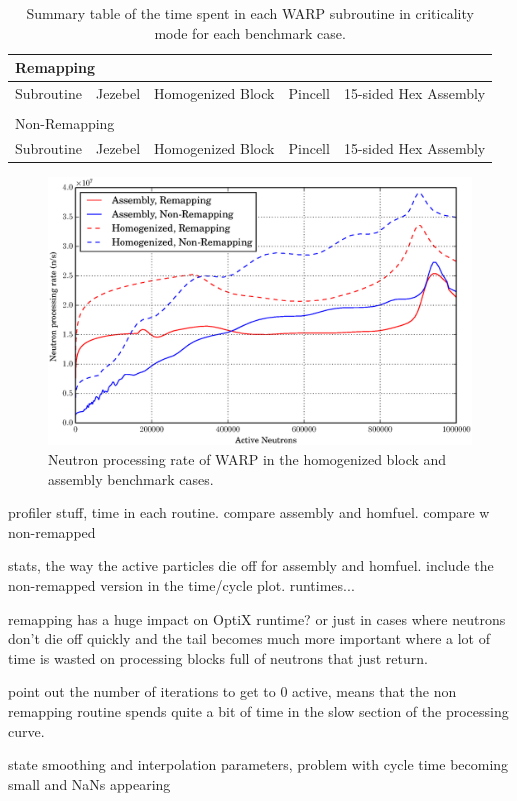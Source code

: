 \begin{table}[h]
\centering
\caption{Summary table of the time spent in each WARP subroutine in criticality mode for each benchmark case.}
\label{profile_summary}
\begin{tabular}{| l | r  | r | r | r |}
\multicolumn{5}{l}{Remapping} \\
 \hline
 Subroutine & Jezebel & Homogenized Block & Pincell & 15-sided Hex Assembly  \\
\hline
\hline
\multicolumn{5}{l}{} \\
\multicolumn{5}{l}{Non-Remapping} \\
 \hline
 Subroutine & Jezebel & Homogenized Block & Pincell & 15-sided Hex Assembly  \\
\hline
\hline
\end{tabular}
\end{table}

\begin{figure}[h!]
\centering
\includegraphics[width=\textwidth]{graphics/finalresults/process_rate.eps}
\caption{Neutron processing rate of WARP in the homogenized block and assembly benchmark cases. \label{process_rate} }
\end{figure}

profiler stuff, time in each routine.  compare assembly and homfuel.  compare w non-remapped

stats, the way the active particles die off for assembly and homfuel.  include the non-remapped version in the time/cycle plot.  runtimes...

remapping has a huge impact on OptiX runtime?  or just in cases where neutrons don't die off quickly and the tail becomes much more important where a lot of time is wasted on processing blocks full of neutrons that just return.

point out the number of iterations to get to 0 active, means that the non remapping routine spends quite a bit of time in the slow section of the processing curve.

state smoothing and interpolation parameters, problem with cycle time becoming small and NaNs appearing




